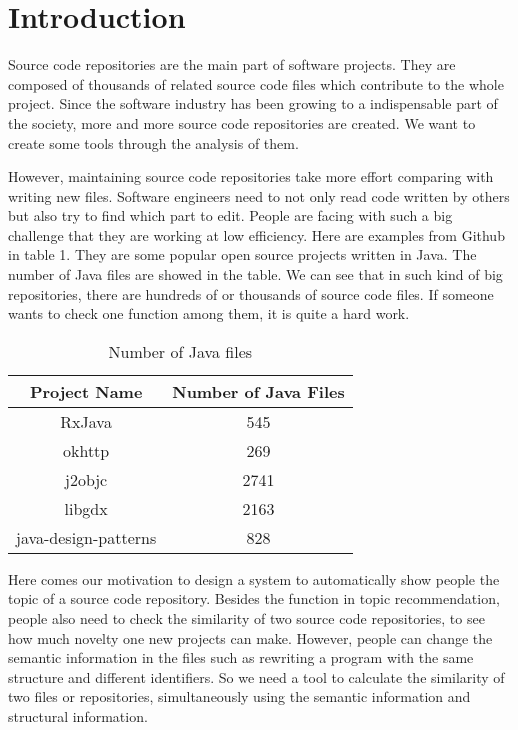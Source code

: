 \section{Introduction}

Source code repositories are the main part of software projects.
They are composed of thousands of related source code files which contribute to the whole project.
Since the software industry has been growing to a indispensable part of the society,
more and more source code repositories are created. We want to create some tools through the analysis
of them.

However, maintaining source code repositories take more effort comparing with writing new files.
Software engineers need to not only read code written by others but also try to find which part to edit.
People are facing with such a big challenge that they are working at low efficiency.
Here are examples from Github in table 1. They are some popular open source projects written in Java.
The number of Java files are showed in the table. We can see that in such kind of big repositories,
there are hundreds of or thousands of source code files. If someone wants to check one function among
them, it is quite a hard work.

\begin{table}[!htp]\label{table:repos}
\caption{Number of Java files}
\centering
\begin{tabular}{|c|c|}
\hline
Project Name & Number of Java Files \\
\hline
RxJava & 545\\
\hline
okhttp & 269\\
\hline
j2objc & 2741\\
\hline
libgdx & 2163\\
\hline
java-design-patterns & 828\\
\hline 
\end{tabular}
\end{table}


Here comes our motivation to design a system to automatically show people the topic of a source code repository.
Besides the function in topic recommendation, people also need to check the similarity of two source code repositories,
to see how much novelty one new projects can make. However, people can change the semantic information in the
files such as rewriting a program with the same structure and different identifiers. So we need a tool to calculate
the similarity of two files or repositories, simultaneously using the semantic information and structural information.

